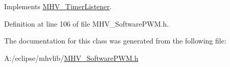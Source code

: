 \-Implements \hyperlink{class_m_h_v___timer_listener_a27e243f8df77035eca626beab5b3e60a}{\-M\-H\-V\-\_\-\-Timer\-Listener}.



\-Definition at line 106 of file \-M\-H\-V\-\_\-\-Software\-P\-W\-M.\-h.



\-The documentation for this class was generated from the following file\-:\begin{DoxyCompactItemize}
\item 
\-A\-:/eclipse/mhvlib/\hyperlink{_m_h_v___software_p_w_m_8h}{\-M\-H\-V\-\_\-\-Software\-P\-W\-M.\-h}\end{DoxyCompactItemize}
